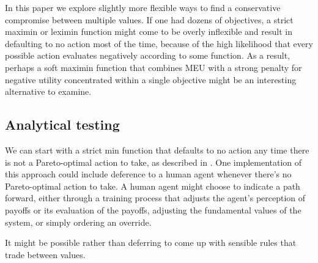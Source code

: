 In this paper we explore slightly more flexible ways to find a conservative compromise between multiple values. If one had dozens of objectives, a strict maximin or leximin function might come to be overly inflexible and result in defaulting to no action most of the time, because of the high likelihood that every possible action evaluates negatively according to some function. As a result, perhaps a soft maximin function that combines MEU with a strong penalty for negative utility concentrated within a single objective might be an interesting alternative to examine.

 
\subsection{Analytical testing}

We can start with a strict min function that defaults to no action any time there is not a Pareto-optimal action to take, as described in \cite{vamplew_human-aligned_2018}. One implementation of this approach could include  deference to a human agent whenever there's no Pareto-optimal action to take. A human agent might choose to indicate a path forward, either through a training process that adjusts the agent's perception of payoffs or its evaluation of the payoffs, adjusting the fundamental values of the system, or simply ordering an override.

It might be possible rather than deferring to come up with sensible rules that trade between values.

